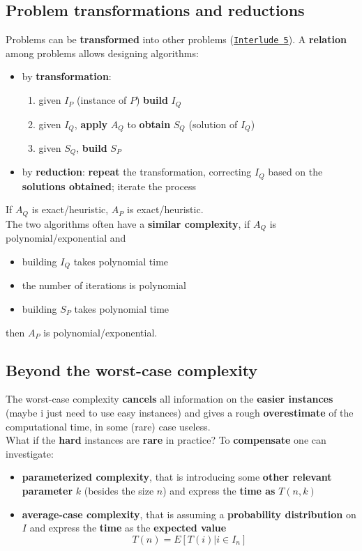 \subsection{Problem transformations and reductions}
Problems can be \textbf{transformed} into other problems (\hyperref[I5]{\texttt{Interlude 5}}). A \textbf{relation} among problems allows designing algorithms: 
\begin{itemize}
	\item by \textbf{transformation}: 
	\begin{enumerate}
		\item given $I_P$ (instance of $P$) \textbf{build} $I_Q$
		\item given $I_Q$, \textbf{apply} $A_Q$ to \textbf{obtain} $S_Q$ (solution of $I_Q$)
		\item given $S_Q$, \textbf{build} $S_P$
	\end{enumerate}
	\item by \textbf{reduction}: \textbf{repeat} the transformation, correcting $I_Q$ based on the \textbf{solutions obtained}; iterate the process
\end{itemize}

If $A_Q$ is exact/heuristic, $A_P$ is exact/heuristic.\\

The two algorithms often have a \textbf{similar complexity}, if $A_Q$ is polynomial/exponential and
\begin{itemize}
	\item building $I_Q$ takes polynomial time
	\item the number of iterations is polynomial
	\item building $S_P$ takes polynomial time
\end{itemize}
then $A_P$ is polynomial/exponential.\\

\newpage

\subsection{Beyond the worst-case complexity}
The worst-case complexity \textbf{cancels} all information on the \textbf{easier instances} (maybe i just need to use easy instances) and gives a rough \textbf{overestimate} of the computational time, in some (rare) case useless.\\

What if the \textbf{hard} instances are \textbf{rare} in practice? To \textbf{compensate} one can investigate: 
\begin{itemize}
	\item \textbf{parameterized complexity}, that is introducing some \textbf{other relevant parameter} $k$ (besides the size $n$) and express the \textbf{time as} $T(n,k)$
	\item \textbf{average-case complexity}, that is assuming a \textbf{probability distribution} on $I$ and express the \textbf{time} as the \textbf{expected value}
	$$ T(n) = E \left[T(i) | i \in I_n \right] $$
\end{itemize}

